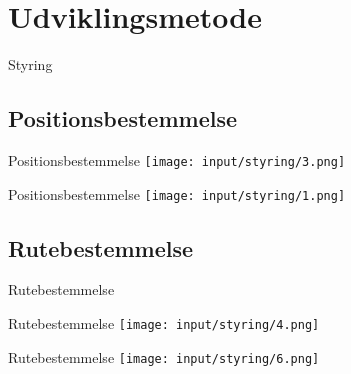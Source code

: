 \section*{Udviklingsmetode}

\begin{frame}{Styring}

\end{frame}

\subsection*{Positionsbestemmelse}

\begin{frame}{Positionsbestemmelse} %
\texttt{[image: input/styring/3.png]}
\end{frame}

\begin{frame}{Positionsbestemmelse} %
\texttt{[image: input/styring/1.png]}
\end{frame}

\subsection*{Rutebestemmelse}

\begin{frame}{Rutebestemmelse} %

\end{frame}

\begin{frame}{Rutebestemmelse} 
\texttt{[image: input/styring/4.png]}
\end{frame}

\begin{frame}{Rutebestemmelse} %
\texttt{[image: input/styring/6.png]}
\end{frame}